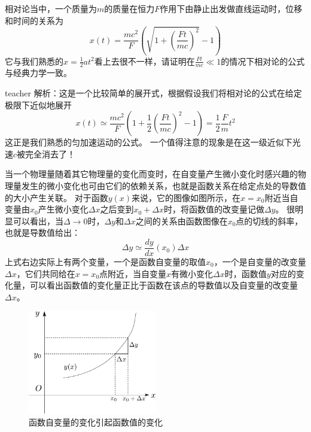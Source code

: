 %


\begin{example}
相对论当中，一个质量为$m$的质量在恒力$F$作用下由静止出发做直线运动时，位移和时间的关系为
\[
x(t)=\frac{mc^2}{F}\left(\sqrt{1+(\frac{Ft}{mc})^2}-1\right)
\]
它与我们熟悉的$x=\frac{1}{2}at^2$看上去很不一样，请证明在$\frac{Ft}{mc}\ll 1$的情况下相对论的公式与经典力学一致。
\begin{taggedblock}{teacher}
\newline
解析：这是一个比较简单的展开式，根据假设我们将相对论的公式在给定极限下近似地展开
\[x(t)\simeq \frac{mc^2}{F}(1+\frac{1}{2}(\frac{Ft}{mc})^2-1)=\frac{1}{2}\frac{F}{m}t^2\]
这正是我们熟悉的匀加速运动的公式。
一个值得注意的现象是在这一级近似下光速$c$被完全消去了！
\end{taggedblock}
\end{example}


当一个物理量随着其它物理量的变化而变时，在自变量产生微小变化时感兴趣的物理量发生的微小变化也可由它们的依赖关系，也就是函数关系在给定点处的导数值的大小产生关联。
对于函数$y(x)$来说，它的图像如图所示，在$x=x_0$附近当自变量由$x_0$产生微小变化$\Delta x$之后变到$x_0+\Delta x$时，将函数值的改变量记做$\Delta y$。
很明显可以看出，当$\Delta \rightarrow 0$时，$\Delta y$和$\Delta x$之间的关系由函数图像在$x_0$点的切线的斜率，也就是导数值给出：
\begin{equation}
\Delta y \simeq \frac{dy}{dx}(x_0)\Delta x
\end{equation}
上式右边实际上有两个变量，一个是函数自变量的取值$x_0$，一个是自变量的改变量$\Delta x$，它们共同给在$x=x_0$点附近，当自变量$x$有微小变化$\Delta x$时，函数值$y$对应的变化量，可以看出函数值的变化量正比于函数在该点的导数值以及自变量的改变量$\Delta x$。
\begin{figure}[hbtp]
\centering
\includegraphics[width=0.5\textwidth]{images/cal-11.pdf}
\caption{函数自变量的变化引起函数值的变化}
\end{figure}


